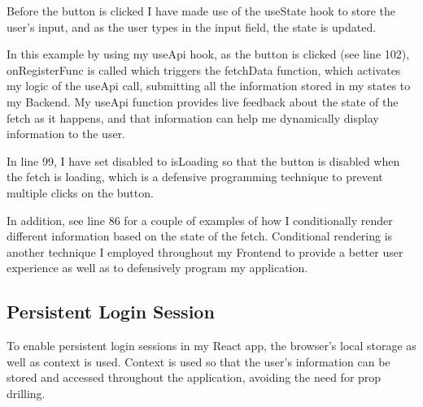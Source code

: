 Before the button is clicked I have made use of the useState hook to store the user's input, and as the user types in the input field, the state is updated.

In this example by using my useApi hook, as the button is clicked (see line 102), onRegisterFunc is called which triggers the fetchData function, which activates my logic of the useApi call, submitting all the information stored in my states to my Backend. My useApi function provides live feedback about the state of the fetch as it happens, and that information can help me dynamically display information to the user.

In line 99, I have set disabled to isLoading so that the button is disabled when the fetch is loading, which is a defensive programming technique to prevent multiple clicks on the button. 

In addition, see line 86 for a couple of examples of how I conditionally render different information based on the state of the fetch. Conditional rendering is another technique I employed throughout my Frontend to provide a better user experience as well as to defensively program my application.

\subsection{Persistent Login Session}
To enable persistent login sessions in my React app, the browser's local storage as well as context is used. Context is used so that the user's information can be stored and accessed throughout the application, avoiding the need for prop drilling. 




